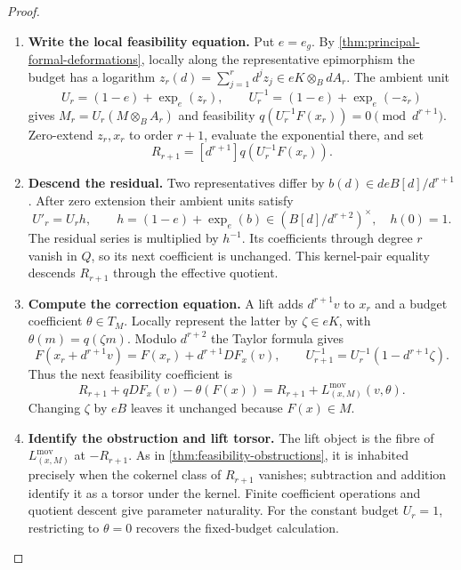 \documentclass[11pt,a4paper]{article}
\numberwithin{algorithm}{section}
\numberwithin{equation}{section}
\theoremstyle{definition}
\theoremstyle{remark}
\theoremstyle{plain}
\theoremstyle{definition}
\theoremstyle{plain}
\begin{document}
\begin{proof}\leavevmode
\begin{enumerate}[leftmargin=*,align=left]
\item \textbf{Write the local feasibility equation.}
Put $e=e_g$. By \cref{thm:principal-formal-deformations}, locally
along the representative epimorphism the budget has a logarithm
$z_r(d)=\sum_{j=1}^r d^jz_j\in eK\otimes_BdA_r$.
The ambient unit
\[
 U_r=(1-e)+\exp_e(z_r),\qquad U_r^{-1}=(1-e)+\exp_e(-z_r)
\]
gives $M_r=U_r(M\otimes_BA_r)$ and feasibility
$q(U_r^{-1}F(x_r))=0\pmod{d^{r+1}}$.
Zero-extend $z_r,x_r$ to order $r+1$, evaluate the exponential
there, and set
\[
 R_{r+1}=[d^{r+1}]q(U_r^{-1}F(x_r)).
\]

\item \textbf{Descend the residual.}
Two representatives differ by $b(d)\in deB[d]/d^{r+1}$.
After zero extension their ambient units satisfy
\[
 U'_r=U_rh,\qquad
 h=(1-e)+\exp_e(b)\in(B[d]/d^{r+2})^\times,\quad h(0)=1.
\]
The residual series is multiplied by $h^{-1}$.
Its coefficients through degree $r$ vanish in $Q$, so its next
coefficient is unchanged. This kernel-pair equality descends
$R_{r+1}$ through the effective quotient.

\item \textbf{Compute the correction equation.}
A lift adds $d^{r+1}v$ to $x_r$ and a budget coefficient
$\theta\in T_M$. Locally represent the latter by $\zeta\in eK$,
with $\theta(m)=q(\zeta m)$.
Modulo $d^{r+2}$ the Taylor formula gives
\[
 F(x_r+d^{r+1}v)=F(x_r)+d^{r+1}DF_x(v),\qquad
 U_{r+1}^{-1}=U_r^{-1}(1-d^{r+1}\zeta).
\]
Thus the next feasibility coefficient is
\[
 R_{r+1}+qDF_x(v)-\theta(F(x))
 =R_{r+1}+L^{\mathrm{mov}}_{(x,M)}(v,\theta).
\]
Changing $\zeta$ by $eB$ leaves it unchanged because $F(x)\in M$.

\item \textbf{Identify the obstruction and lift torsor.}
The lift object is the fibre of $L^{\mathrm{mov}}_{(x,M)}$ at
$-R_{r+1}$. As in \cref{thm:feasibility-obstructions}, it is
inhabited precisely when the cokernel class of $R_{r+1}$ vanishes;
subtraction and addition identify it as a torsor under the kernel.
Finite coefficient operations and quotient descent give parameter
naturality. For the constant budget $U_r=1$, restricting to
$\theta=0$ recovers the fixed-budget calculation.
\end{enumerate}
\end{proof}
\end{document}
